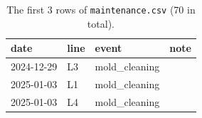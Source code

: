\begin{table}[H]\centering\footnotesize\ttfamily
\begin{tabular}{@{}llll@{}}\toprule
date & line & event & note \\\midrule
2024-12-29 & L3 & mold\_cleaning &  \\
2025-01-03 & L1 & mold\_cleaning &  \\
2025-01-03 & L4 & mold\_cleaning &  \\
\bottomrule\end{tabular}
\caption{The first 3 rows of \texttt{maintenance.csv} (70 in total).}
\end{table}
